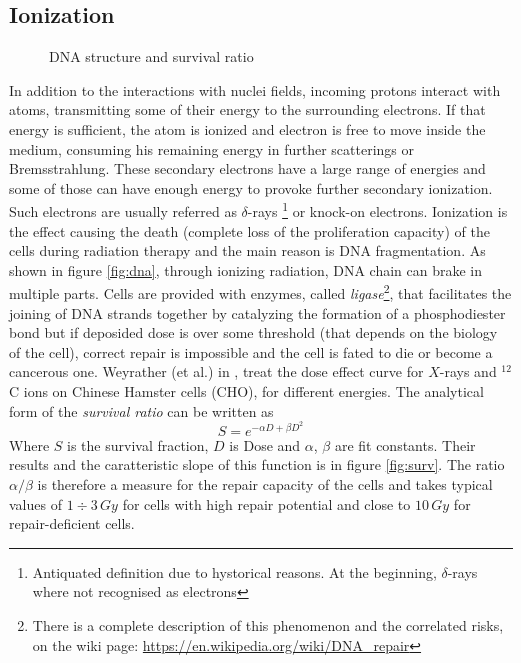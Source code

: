 \documentclass[12pt, a4paper, twoside]{book}
\begin{document}
\subsection{Ionization}
\begin{figure}[!t]
     \hfill
\caption{DNA structure and survival ratio}
   \end{figure}
In addition to the interactions with nuclei fields, incoming protons interact with atoms, transmitting some of their energy to the surrounding electrons. If that energy is sufficient, the atom is ionized and electron is free to move inside the medium, consuming his remaining energy in further scatterings or Bremsstrahlung. These secondary electrons have a large range of energies and some of those can have enough energy to provoke further secondary ionization. Such electrons are usually referred as $\delta$-rays \footnote{Antiquated definition due to hystorical reasons. At the beginning, $\delta$-rays where not recognised as electrons} or knock-on electrons.
Ionization is the effect causing the death (complete loss of the proliferation capacity) of the cells during radiation therapy and  the main reason is DNA fragmentation. As shown in figure \ref{fig:dna}, through ionizing radiation, DNA chain can brake in multiple parts. Cells are provided with enzymes, called \emph{ligase}\footnote{There is a complete description of this phenomenon and the correlated risks, on the wiki page: \url{https://en.wikipedia.org/wiki/DNA_repair}}, that facilitates the joining of DNA strands together by catalyzing the formation of a phosphodiester bond but if deposided dose is over some threshold (that depends on the biology of the cell), correct repair is impossible and the cell is fated to die or become a cancerous one.
Weyrather (et al.) in \cite{weyr:rbe}, treat the dose effect curve for $X$-rays and $^{12}$C ions on Chinese Hamster cells (CHO), for different energies. The analytical form of the \emph{survival ratio} can be written as
\[
S = e^{-\alpha D + \beta D^2}
\]
Where $S$ is the survival fraction, $D$ is Dose and $\alpha$, $\beta$ are fit constants.
Their results and the caratteristic slope of this function is in figure \ref{fig:surv}.
The ratio $\alpha/\beta$ is therefore a measure for the repair capacity of the cells and takes typical values of $1\div3\, Gy$ for cells with high repair potential and close to $10\, Gy$ for repair-deficient cells.
\end{document}
